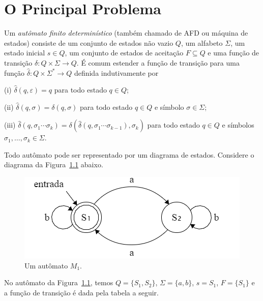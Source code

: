 \documentclass[
	12pt,				%
	openany,
	oneside,
	a4paper,			%
	english,			%
	brazil,				%
	]{abntex2}
\begin{document}
\chapter[O Principal Problema]{O Principal Problema}

Um \emph{autômato finito determinístico} (também chamado de AFD ou máquina de estados) consiste de um conjunto de estados não vazio $Q$, um alfabeto $\Sigma$, um estado inicial $s \in Q$, um conjunto de estados de aceitação $F \subseteq Q$ e uma função de transição $\delta \colon Q \times \Sigma \rightarrow Q$. É comum estender a função de transição para uma função $\hat{\delta} \colon Q \times \Sigma^* \rightarrow Q$ definida indutivamente por
\begin{alineas}%
	\item[(i)] $\hat{\delta}(q, \varepsilon) = q$ para todo estado $q \in Q$;
	\item[(ii)] $\hat{\delta}(q, \sigma) = \delta(q, \sigma)$ para todo estado $q \in Q$ e símbolo $\sigma \in \Sigma$;
	\item[(iii)] $\hat{\delta}(q, \sigma_1 \cdots \sigma_k) = \delta(\hat{\delta}(q, \sigma_1 \cdots \sigma_{k-1}), \sigma_k)$ para todo estado $q \in Q$ e símbolos $\sigma_1, \dots, \sigma_k \in \Sigma$.
\end{alineas}



Todo autômato pode ser representado por um diagrama de estados. Considere o diagrama da Figura~\ref{fig:aut01} abaixo.

\begin{figure}[H]
	\vspace{-0.4cm}
	\centering
	\includegraphics[scale=0.75]{aut01.png}
	\vspace{-0.5cm}
	\caption{Um autômato $M_1$.}
	\label{fig:aut01}
	\vspace{-0.5cm}
\end{figure}


No autômato da Figura~\ref{fig:aut01}, temos $Q = \{S_1, S_2\}$, $\Sigma = \{a, b\}$, $s = S_1$, $F = \{S_1\}$ e a função de transição  é dada pela tabela a seguir.
\end{document}
